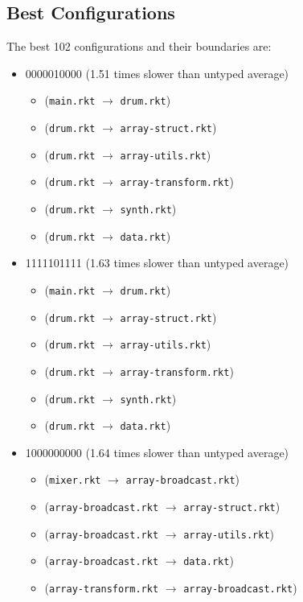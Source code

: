 \documentclass{article}
\newcommand{\mono}[1]{\texttt{#1}}
\begin{document}
\subsection{Best Configurations}
The best 102 configurations and their boundaries are:
\begin{itemize}
\item 0000010000 (1.51 times slower than untyped average)
  \begin{itemize}
  \item (\mono{main.rkt} $\rightarrow$ \mono{drum.rkt})
  \item (\mono{drum.rkt} $\rightarrow$ \mono{array-struct.rkt})
  \item (\mono{drum.rkt} $\rightarrow$ \mono{array-utils.rkt})
  \item (\mono{drum.rkt} $\rightarrow$ \mono{array-transform.rkt})
  \item (\mono{drum.rkt} $\rightarrow$ \mono{synth.rkt})
  \item (\mono{drum.rkt} $\rightarrow$ \mono{data.rkt})
  \end{itemize}
\item 1111101111 (1.63 times slower than untyped average)
  \begin{itemize}
  \item (\mono{main.rkt} $\rightarrow$ \mono{drum.rkt})
  \item (\mono{drum.rkt} $\rightarrow$ \mono{array-struct.rkt})
  \item (\mono{drum.rkt} $\rightarrow$ \mono{array-utils.rkt})
  \item (\mono{drum.rkt} $\rightarrow$ \mono{array-transform.rkt})
  \item (\mono{drum.rkt} $\rightarrow$ \mono{synth.rkt})
  \item (\mono{drum.rkt} $\rightarrow$ \mono{data.rkt})
  \end{itemize}
\item 1000000000 (1.64 times slower than untyped average)
  \begin{itemize}
  \item (\mono{mixer.rkt} $\rightarrow$ \mono{array-broadcast.rkt})
  \item (\mono{array-broadcast.rkt} $\rightarrow$ \mono{array-struct.rkt})
  \item (\mono{array-broadcast.rkt} $\rightarrow$ \mono{array-utils.rkt})
  \item (\mono{array-broadcast.rkt} $\rightarrow$ \mono{data.rkt})
  \item (\mono{array-transform.rkt} $\rightarrow$ \mono{array-broadcast.rkt})

\end{itemize}
\end{itemize}
\end{document}
